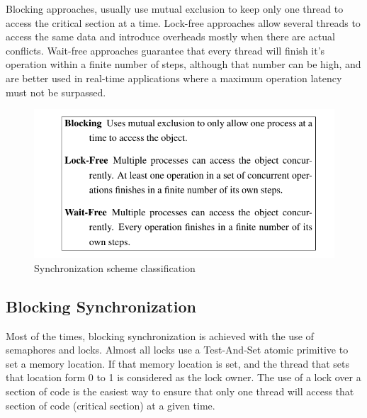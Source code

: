 Blocking approaches, usually use mutual exclusion to keep only one thread to access the critical section at a time. Lock-free approaches allow several threads to access the same data and introduce overheads mostly when there are actual conflicts. Wait-free approaches guarantee that every thread will finish it's operation within a finite number of steps, although that number can be high, and are better used in real-time applications where a maximum operation latency must not be surpassed. 
 
 \begin{figure}

 \centering

  \includegraphics[scale=0.5]{progress_gar.png}

\caption{Synchronization scheme classification}

\label{progress_gar}

\end{figure}


\subsection{Blocking Synchronization}

Most of the times, blocking synchronization is achieved with the use of semaphores and locks. Almost all locks use a Test-And-Set atomic primitive to set a memory location. If that memory location is set,  and the thread that sets that location form 0 to 1 is considered as the lock owner. The use of a lock over a section of code is the easiest way to ensure that only one thread will access that section of code (critical section) at a given time.

